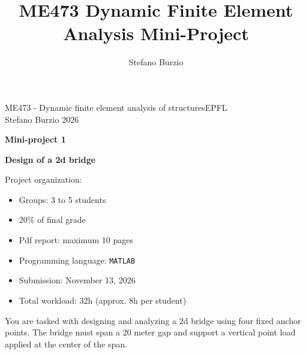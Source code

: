 \documentclass[12pt]{article}
\title{ME473 Dynamic Finite Element Analysis Mini-Project}
\author{Stefano Burzio}
\date{}
\begin{document}
\noindent ME473 - Dynamic finite element analysis of structures\hfill EPFL\\
Stefano Burzio \hfill 2026\\
\vspace{0.3cm}

\hspace*{\fill}\textbf{\Large Mini-project 1}\hspace*{\fill}
\begin{center}
  \textbf{\Large Design of a 2d bridge}
\end{center}

\hrulefill
\vspace{0.3cm}
\newline
{Project organization:}
\vspace{0.2cm}
\newline
\begin{minipage}[t]{0.38\textwidth}
  \begin{itemize}[itemsep=0.005cm]
    \item Groups: 3 to 5 students
    \item 20\% of final grade
    \item Pdf report: maximum 10 pages
  \end{itemize}
\end{minipage}
\hfill
\begin{minipage}[t]{0.58\textwidth}
  \begin{itemize}[itemsep=0.005cm]
    \item Programming language: \texttt{MATLAB}
    \item Submission: November 13, 2026
    \item Total workload:  32h (approx. 8h per student)
  \end{itemize}
\end{minipage}
\vspace{0.3cm}

\hrulefill
\vspace{0.3cm}

You are tasked with designing and analyzing a 2d bridge using four fixed anchor points. The bridge must span a 20 meter gap and support a vertical point load applied at the center of the span.
\end{document}
